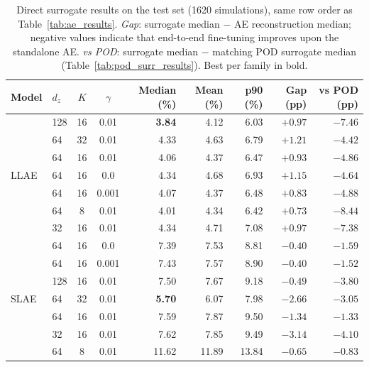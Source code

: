 ﻿\documentclass[a4paper,12pt]{article}
\theoremstyle{definition}
\theoremstyle{remark}
\begin{document}
\begin{table}[htbp]
    \centering
    \small
    \setlength{\tabcolsep}{5pt}
    \renewcommand{\arraystretch}{1.3}
    \begin{tabular}{llccrrrrr}
        \toprule
        \textbf{Model} & $d_z$ & $K$ & $\gamma$
            & \textbf{Median (\%)} & \textbf{Mean (\%)} & \textbf{p90 (\%)}
            & \textbf{Gap (pp)} & \textbf{vs POD (pp)} \\
        \midrule
        \multirow{7}{*}{LLAE}
          & 128 & 16 & 0.01  & \textbf{3.84} &  4.12 &  6.03  & $+0.97$ & $-7.46$ \\
          & 64  & 32 & 0.01  &      4.33 &  4.63 &  6.79  & $+1.21$ & $-4.42$ \\
          & 64  & 16 & 0.01  &      4.06 &  4.37 &  6.47  & $+0.93$ & $-4.86$ \\
          & 64  & 16 & 0.0   &      4.34 &  4.68 &  6.93  & $+1.15$ & $-4.64$ \\
          & 64  & 16 & 0.001 &      4.07 &  4.37 &  6.48  & $+0.83$ & $-4.88$ \\
          & 64  &  8 & 0.01  &      4.01 &  4.34 &  6.42  & $+0.73$ & $-8.44$ \\
          & 32  & 16 & 0.01  &      4.34 &  4.71 &  7.08  & $+0.97$ & $-7.38$ \\
        \midrule
        \multirow{7}{*}{SLAE}
          & 64  & 16 & 0.0   &      7.39 &  7.53 &  8.81  & $-0.40$ & $-1.59$ \\
          & 64  & 16 & 0.001 &      7.43 &  7.57 &  8.90  & $-0.40$ & $-1.52$ \\
          & 128 & 16 & 0.01  &      7.50 &  7.67 &  9.18  & $-0.49$ & $-3.80$ \\
          & 64  & 32 & 0.01  & \textbf{5.70} &  6.07 &  7.98  & $-2.66$ & $-3.05$ \\
          & 64  & 16 & 0.01  &      7.59 &  7.87 &  9.50  & $-1.34$ & $-1.33$ \\
          & 32  & 16 & 0.01  &      7.62 &  7.85 &  9.49  & $-3.14$ & $-4.10$ \\
          & 64  &  8 & 0.01  &     11.62 & 11.89 & 13.84  & $-0.65$ & $-0.83$ \\
        \bottomrule
    \end{tabular}
    \caption{Direct surrogate results on the test set (1620 simulations), same row order as Table~\ref{tab:ae_results}. \emph{Gap}: surrogate median $-$ AE reconstruction median; negative values indicate that end-to-end fine-tuning improves upon the standalone AE. \emph{vs POD}: surrogate median $-$ matching POD surrogate median (Table~\ref{tab:pod_surr_results}). Best per family in bold.}
    \label{tab:surr_results}
\end{table}
\end{document}
